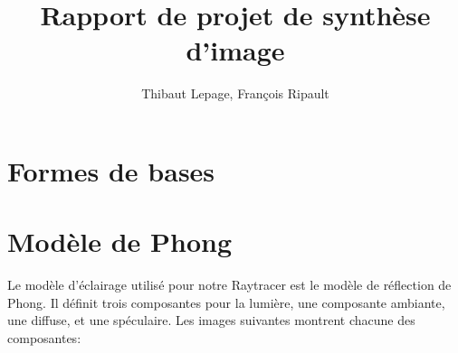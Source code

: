 \documentclass{article}
\title{Rapport de projet de synthèse d'image}
\author{Thibaut Lepage, François Ripault}
\begin{document}
\maketitle

\section{Formes de bases}

\section{Modèle de Phong}

Le modèle d'éclairage utilisé pour notre Raytracer est le modèle de réflection
de Phong. Il définit trois composantes pour la lumière, une composante
ambiante, une diffuse, et une spéculaire.
Les images suivantes montrent chacune des composantes:
\end{document}
